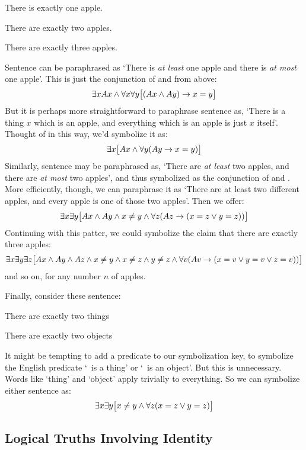 \begin{earg}
\item[\ex{exactly1}] There is exactly one apple.
\item[\ex{exactly2}] There are exactly two apples.
\item[\ex{exactly3}] There are exactly three apples.
\end{earg}
Sentence  can be paraphrased as `There is \emph{at least} one apple and there is \emph{at most} one apple'. This is just the conjunction of  and   from above:
$$\exists x Ax \wedge \forall x\forall y\bigl[(Ax \wedge Ay) \rightarrow x=y\bigr]$$
But it is perhaps more straightforward to paraphrase sentence  as, `There is a thing $x$ which is an apple, and everything which is an apple is just $x$ itself'. Thought of in this way, we'd symbolize it as:
$$\exists x\bigl[Ax \wedge \forall y(Ay \rightarrow x= y)\bigr]$$
Similarly, sentence  may be paraphrased as, `There are \emph{at least} two apples, and there are \emph{at most} two apples', and thus symbolized as the conjunction of  and .
More efficiently, though, we can paraphrase it as `There are at least two different apples, and every apple is one of those two apples'. Then we offer:
$$\exists x\exists y\bigl[Ax \wedge Ay \wedge x \neq y \wedge \forall z(Az \rightarrow ( x= z \vee y = z))\bigr]$$
Continuing with this patter, we could symbolize the claim that there are exactly three apples:
$$\exists x \exists y \exists z\bigl[Ax \wedge Ay \wedge Az \wedge x \neq y \wedge x \neq z \wedge y \neq z \wedge \forall v(Av \rightarrow (x = v \vee y = v \vee z = v))\bigr]$$
and so on, for any number $n$ of apples.

Finally, consider these sentence:
\begin{earg}
\item[\ex{exactly2things}] There are exactly two things
\item[\ex{exactly2objects}] There are exactly two objects
\end{earg}
It might be tempting to add a predicate to our symbolization key, to symbolize the English predicate `\blank\ is a thing' or `\blank\ is an object'. But this is unnecessary. Words like `thing' and `object' apply trivially to everything. So we can symbolize either sentence as:
		$$\exists x \exists y \bigl[x \neq y \wedge \forall z(x=z \vee y = z)\bigr]$$

\subsection{Logical Truths Involving Identity}\label{s:LogicalTruthsID}


